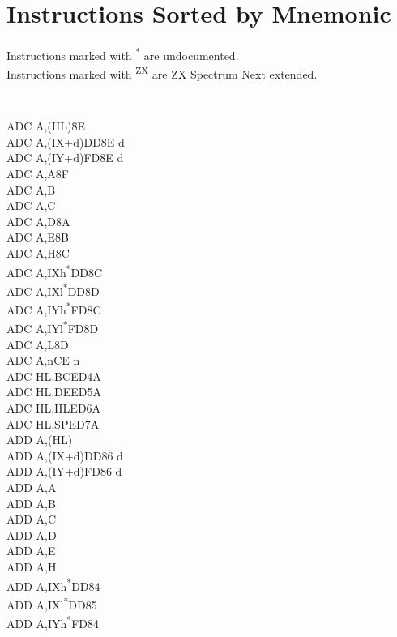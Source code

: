 \documentclass[twoside,openright,a4paper]{book}
\begin{document}
\chapter{Instructions Sorted by Mnemonic}

Instructions marked with \textsuperscript{*} are undocumented.\\
Instructions marked with \textsuperscript{ZX} are ZX Spectrum Next extended.
\setlength\columnsep{2em}
\begin{multicols}{3}
{
	\tt 
	\small
	\begin{tabbing}
	ADC A,(HL){\qquad}{\qquad}\=8E\\
	ADC A,(IX+d)\>DD8E d\\
	ADC A,(IY+d)\>FD8E d\\
	ADC A,A\>8F\\
	ADC A,B\\
	ADC A,C\\
	ADC A,D\>8A\\
	ADC A,E\>8B\\
	ADC A,H\>8C\\
	ADC A,IXh\textsuperscript{*}\>DD8C\\
	ADC A,IXl\textsuperscript{*}\>DD8D\\
	ADC A,IYh\textsuperscript{*}\>FD8C\\
	ADC A,IYl\textsuperscript{*}\>FD8D\\
	ADC A,L\>8D\\
	ADC A,n\>CE n\\
	ADC HL,BC\>ED4A\\
	ADC HL,DE\>ED5A\\
	ADC HL,HL\>ED6A\\
	ADC HL,SP\>ED7A\\
	ADD A,(HL)\\
	ADD A,(IX+d)\>DD86 d\\
	ADD A,(IY+d)\>FD86 d\\
	ADD A,A\\
	ADD A,B\\
	ADD A,C\\
	ADD A,D\\
	ADD A,E\\
	ADD A,H\\
	ADD A,IXh\textsuperscript{*}\>DD84\\
	ADD A,IXl\textsuperscript{*}\>DD85\\
	ADD A,IYh\textsuperscript{*}\>FD84\\

\end{tabbing}}
\end{multicols}
\end{document}

